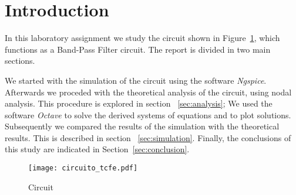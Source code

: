 \section{Introduction}
\label{sec:introduction}

In this laboratory assignment we study the circuit 
shown in Figure~\ref{fig:circuit}, which functions as a Band-Pass Filter 
circuit. The report is divided in two main sections.

We started with the simulation of the circuit using the software 
\textit{Ngspice}. 
Afterwards we proceded with the theoretical analysis of the circuit, 
using nodal analysis. 
This procedure is explored in section ~\ref{sec:analysis};
We used the software \textit{Octave} to solve the derived systems 
of equations and to plot solutions.
Subsequently we compared the results of the simulation with the 
theoretical results. This is described in section ~\ref{sec:simulation}.
Finally, the conclusions of this study are indicated in
Section~\ref{sec:conclusion}.

\begin{figure}[ht] \centering
    \texttt{[image: circuito\_tcfe.pdf]}
    \caption{Circuit}
    \label{fig:circuit}
\end{figure}

